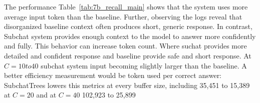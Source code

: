 



The performance Table~\ref{tab:7b_recall_main} shows that the system uses more average input token than the baseline. Further, observing the logs reveal that disorganized baseline context often produces short, generic response. In contrast, Subchat system provides enough context to the model to answer more confidently and fully. This behavior can increase token count. Where suchat provides more detailed and confident response and baseline provide safe and short response. At $C=10 to 40$ subchat system input becoming slightly larger than the baseline. A better efficiency measurement would be token used per correct answer: SubchatTrees lowers this metrics at every buffer size, including 35,451 to 15,389 at $C=20$ and at $C=40$ 102,923 to 25,899





